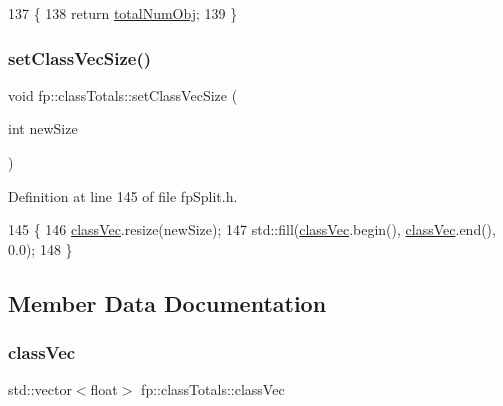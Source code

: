 \begin{DoxyCode}
137                                 \{
138                 \textcolor{keywordflow}{return} \hyperlink{classfp_1_1classTotals_a97be63e3e4a1b7c553df839034828aae}{totalNumObj};
139             \}
\end{DoxyCode}
\mbox{\label{classfp_1_1classTotals_a026ec5ce8d0ad54702891c0d6ba51fc8}} 
\subsubsection{\texorpdfstring{set\+Class\+Vec\+Size()}{setClassVecSize()}}
{\footnotesize\ttfamily void fp\+::class\+Totals\+::set\+Class\+Vec\+Size (\begin{DoxyParamCaption}\item[{int}]{new\+Size }\end{DoxyParamCaption})\hspace{0.3cm}{\ttfamily [inline]}}



Definition at line 145 of file fp\+Split.\+h.


\begin{DoxyCode}
145                                                     \{
146                 \hyperlink{classfp_1_1classTotals_af96102537592dbda8601d0235dfccfca}{classVec}.resize(newSize);
147                 std::fill(\hyperlink{classfp_1_1classTotals_af96102537592dbda8601d0235dfccfca}{classVec}.begin(), \hyperlink{classfp_1_1classTotals_af96102537592dbda8601d0235dfccfca}{classVec}.end(), 0.0);
148             \}
\end{DoxyCode}


\subsection{Member Data Documentation}
\mbox{\label{classfp_1_1classTotals_af96102537592dbda8601d0235dfccfca}} 
\subsubsection{\texorpdfstring{class\+Vec}{classVec}}
{\footnotesize\ttfamily std\+::vector$<$float$>$ fp\+::class\+Totals\+::class\+Vec\hspace{0.3cm}{\ttfamily [protected]}}



